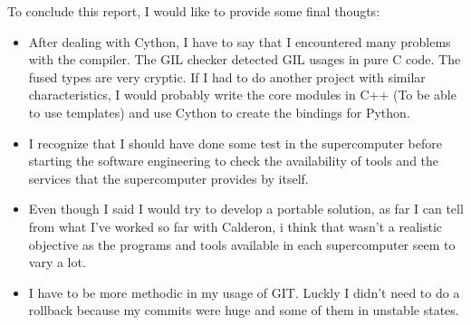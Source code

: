 \documentclass{tfg_domingo}
\begin{document}
  To conclude this report, I would like to provide some final thougts:
  \begin{itemize}

    \item After dealing with Cython, I have to say that I encountered many
    problems with the compiler. The GIL checker detected GIL usages in pure C
    code. The fused types are very cryptic. If I had to do another project
    with similar characteristics, I would probably write the core modules in
    C++ (To be able to use templates) and use Cython to create the
    bindings for Python.

    \item I recognize that I should have done some test in the supercomputer
    before starting the software engineering to check the availability
    of tools and the services that the supercomputer provides by itself.

    \item Even though I said I would try to develop a portable solution, as
    far I can tell from what I've worked so far with Calderon, i think that
    wasn't a realistic objective as the programs and tools available in each
    supercomputer seem to vary a lot.

    \item I have to be more methodic in my usage of GIT. Luckly I didn't need
    to do a rollback because my commits were huge and some of them in unstable
    states.

  \end{itemize}




\backmatter

\end{document}
